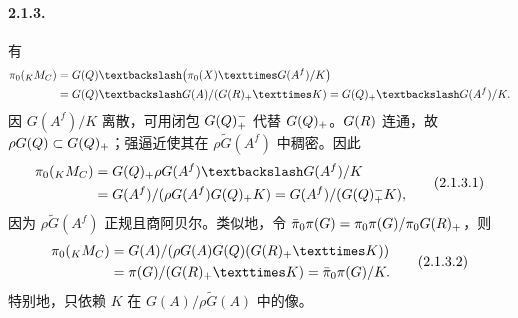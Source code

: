 \paragraph*{2.1.3.} 有
\[
 \begin{split}
 \pi_0({}_KM_{\C})
 &=G(\Q)\backslash\bigl(\pi_0(X)\times G(A^f)/K\bigr)\\
 &=G(\Q)\backslash G(A)/(G(\R)_+\times K)
 =G(\Q)_+\backslash G(A^f)/K.
 \end{split}
\]
因 $G(A^f)/K$ 离散，可用闭包 $G(Q)_+^-$ 代替 $G(Q)_+$。$G(R)$ 连通，故 $\rho G(Q)\subset G(Q)_+$；强逼近使其在 $\rho\widetilde G(A^f)$ 中稠密。因此
\begin{equation}
 \begin{split}
 \pi_0({}_KM_{\C})
 &=G(\Q)_+\rho\widetilde G(A^f)\backslash G(A^f)/K\\
 &=G(A^f)/(\rho\widetilde G(A^f)G(\Q)_+K)
 =G(A^f)/(G(\Q)_+^-K),
 \end{split}
 \tag{2.1.3.1}
\end{equation}
因为 $\rho\widetilde G(A^f)$ 正规且商阿贝尔。类似地，令 $\bar\pi_0\pi(G)=\pi_0\pi(G)/\pi_0G(R)_+$，则
\begin{equation}
 \begin{split}
 \pi_0({}_KM_{\C})
 &=G(A)/(\rho\widetilde G(A)G(\Q)(G(\R)_+\times K))\\
 &=\pi(G)/(G(\R)_+\times K)=\bar\pi_0\pi(G)/K.
 \end{split}
 \tag{2.1.3.2}
\end{equation}
特别地，只依赖 $K$ 在 $G(A)/\rho\widetilde G(A)$ 中的像。
